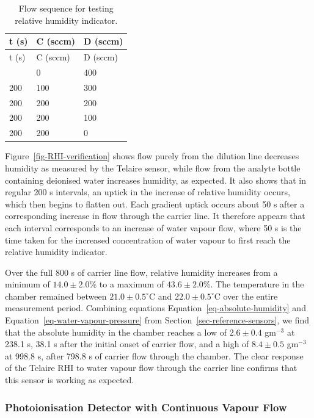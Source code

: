 \documentclass[
  a4paper,
]{scrbook}
\begin{document}
\hypertarget{tbl-RHI-flow-sequence}{}
\begin{longtable}[]{@{}lll@{}}
\caption{\label{tbl-RHI-flow-sequence}Flow sequence for testing relative
humidity indicator.}\tabularnewline
\toprule\noalign{}
t (s) & C (sccm) & D (sccm) \\
\midrule\noalign{}
\endfirsthead
\toprule\noalign{}
t (s) & C (sccm) & D (sccm) \\
\midrule\noalign{}
\endhead
\bottomrule\noalign{}
\endlastfoot
200 & 0 & 400 \\
200 & 100 & 300 \\
200 & 200 & 200 \\
200 & 200 & 100 \\
200 & 200 & 0 \\
\end{longtable}

Figure~\ref{fig-RHI-verification} shows flow purely from the dilution
line decreases humidity as measured by the Telaire sensor, while flow
from the analyte bottle containing deionised water increases humidity,
as expected. It also shows that in regular 200 s intervals, an uptick in
the increase of relative humidity occurs, which then begins to flatten
out. Each gradient uptick occurs about 50 s after a corresponding
increase in flow through the carrier line. It therefore appears that
each interval corresponds to an increase of water vapour flow, where 50
s is the time taken for the increased concentration of water vapour to
first reach the relative humidity indicator.

Over the full 800 s of carrier line flow, relative humidity increases
from a minimum of \(14.0\pm2.0\)\% to a maximum of \(43.6\pm2.0\)\%. The
temperature in the chamber remained between \(21.0\pm0.5^\circ\)C and
\(22.0\pm0.5^\circ\)C over the entire measurement period. Combining
equations Equation~\ref{eq-absolute-humidity} and
Equation~\ref{eq-water-vapour-pressure} from
Section~\ref{sec-reference-sensors}, we find that the absolute humidity
in the chamber reaches a low of \(2.6\pm0.4\) gm\(^{-3}\) at 238.1 s,
38.1 s after the initial onset of carrier flow, and a high of
\(8.4\pm0.5\) gm\(^{-3}\) at 998.8 s, after 798.8 s of carrier flow
through the chamber. The clear response of the Telaire RHI to water
vapour flow through the carrier line confirms that this sensor is
working as expected.

\hypertarget{photoionisation-detector-with-continuous-vapour-flow}{%
\subsubsection*{Photoionisation Detector with Continuous Vapour
Flow}\label{photoionisation-detector-with-continuous-vapour-flow}}
\end{document}
